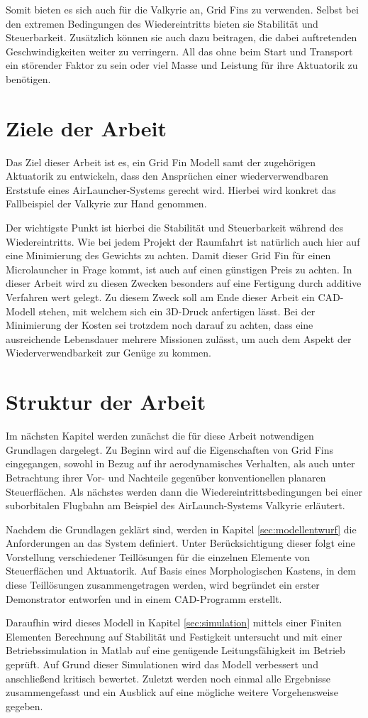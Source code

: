 Somit bieten es sich auch für die Valkyrie an, Grid Fins zu verwenden. Selbst bei den extremen Bedingungen des Wiedereintritts bieten sie Stabilität und Steuerbarkeit. Zusätzlich können sie auch dazu beitragen, die dabei auftretenden Geschwindigkeiten weiter zu verringern. All das ohne beim Start und Transport ein störender Faktor zu sein oder viel Masse und Leistung für ihre Aktuatorik zu benötigen.

\section{Ziele der Arbeit}
Das Ziel dieser Arbeit ist es, ein Grid Fin Modell samt der zugehörigen Aktuatorik zu entwickeln, dass den Ansprüchen einer wiederverwendbaren Erststufe eines AirLauncher-Systems gerecht wird. Hierbei wird konkret das Fallbeispiel der Valkyrie zur Hand genommen.

Der wichtigste Punkt ist hierbei die Stabilität und Steuerbarkeit während des Wiedereintritts. Wie bei jedem Projekt der Raumfahrt ist natürlich auch hier auf eine Minimierung des Gewichts zu achten. Damit dieser Grid Fin für einen Microlauncher in Frage kommt, ist auch auf einen günstigen Preis zu achten. In dieser Arbeit wird zu diesen Zwecken besonders auf eine Fertigung durch additive Verfahren wert gelegt. Zu diesem Zweck soll am Ende dieser Arbeit ein CAD-Modell stehen, mit welchem sich ein 3D-Druck anfertigen lässt. Bei der Minimierung der Kosten sei trotzdem noch darauf zu achten, dass eine ausreichende Lebensdauer mehrere Missionen zulässt, um auch dem Aspekt der Wiederverwendbarkeit zur Genüge zu kommen.

\section{Struktur der Arbeit}
Im nächsten Kapitel werden zunächst die für diese Arbeit notwendigen Grundlagen dargelegt. Zu Beginn wird auf die Eigenschaften von Grid Fins eingegangen, sowohl in Bezug auf ihr aerodynamisches Verhalten, als auch unter Betrachtung ihrer Vor- und Nachteile gegenüber konventionellen planaren Steuerflächen. Als nächstes werden dann die Wiedereintrittsbedingungen bei einer suborbitalen Flugbahn am Beispiel des AirLaunch-Systems Valkyrie erläutert.

Nachdem die Grundlagen geklärt sind, werden in Kapitel \ref{sec:modellentwurf} die Anforderungen an das System definiert. Unter Berücksichtigung dieser folgt eine Vorstellung verschiedener Teillösungen für die einzelnen Elemente von Steuerflächen und Aktuatorik. Auf Basis eines Morphologischen Kastens, in dem diese Teillösungen zusammengetragen werden, wird begründet ein erster Demonstrator entworfen und in einem CAD-Programm erstellt.

Daraufhin wird dieses Modell in Kapitel \ref{sec:simulation} mittels einer Finiten Elementen Berechnung auf Stabilität und Festigkeit untersucht und mit einer Betriebssimulation in Matlab auf eine genügende
Leitungsfähigkeit im Betrieb geprüft. Auf Grund dieser Simulationen wird das Modell verbessert und anschließend kritisch bewertet.
Zuletzt werden noch einmal alle Ergebnisse zusammengefasst und ein Ausblick auf eine mögliche weitere Vorgehensweise gegeben.
